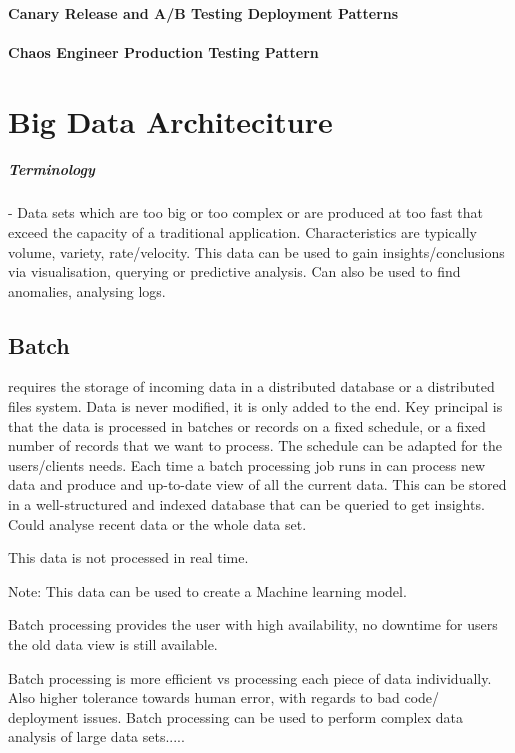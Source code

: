 \documentclass[a4paper, 11pt]{book}
\begin{document}
    \subsubsection{Canary Release and A/B Testing Deployment Patterns}
    \subsubsection{Chaos Engineer Production Testing Pattern}

    \chapter{Big Data Architeciture}

    \paragraph{Terminology} - Data sets which are too big or too complex or are produced at too fast that exceed the capacity of a traditional application.
    Characteristics are typically volume, variety, rate/velocity.
    This data can be used to gain insights/conclusions via visualisation, querying or predictive analysis.
    Can also be used to find anomalies, analysing logs.


    \section{Batch}
    requires the storage of incoming data in a distributed database or a distributed files system.
    Data is never modified, it is only added to the end.
    Key principal is that the data is processed in batches or records on a fixed schedule, or a fixed number of records that we want to process.
    The schedule can be adapted for the users/clients needs.
    Each time a batch processing job runs in can process new data and produce and up-to-date view of all the current data.
    This can be stored in a well-structured and indexed database that can be queried to get insights.
    Could analyse recent data or the whole data set.

    This data is not processed in real time.

    Note: This data can be used to create a Machine learning model.

    Batch processing provides the user with high availability, no downtime for users the old data view is still available.

    Batch processing is more efficient vs processing each piece of data individually. Also higher tolerance towards human error, with regards to bad code/ deployment issues.
    Batch processing can be used to perform complex data analysis of large data sets.....
\end{document}
